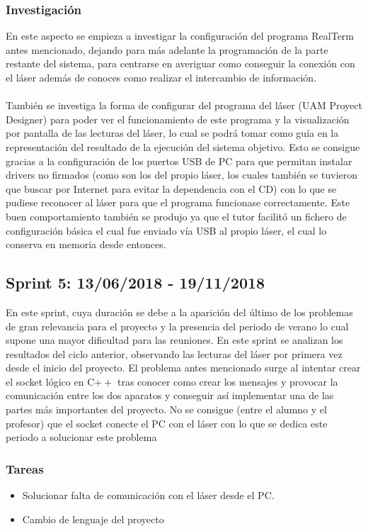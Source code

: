 \subsubsection{Investigación}
En este aspecto se empieza a investigar la configuración del programa RealTerm antes mencionado, dejando para más adelante la programación de la parte restante del sistema, para centrarse en averiguar como conseguir la conexión con el láser además de conoces como realizar el intercambio de información.\\
\\
También se investiga la forma de configurar del programa del láser (UAM Proyect Designer) para poder ver el funcionamiento de este programa y la visualización por pantalla de las lecturas del láser, lo cual se podrá tomar como guía en la representación del resultado de la ejecución del sistema objetivo. Esto se consigue gracias a la configuración de los puertos USB de PC para que permitan instalar drivers no firmados (como son los del propio láser, los cuales también se tuvieron que buscar por Internet para evitar la dependencia con el CD) con lo que se pudiese reconocer al láser para que el programa funcionase correctamente. Este buen comportamiento también se produjo ya que el tutor facilitó un fichero de configuración básica el cual fue enviado vía USB al propio láser, el cual lo conserva en memoria desde entonces.\\

\subsection{Sprint 5: 13/06/2018 - 19/11/2018}
En este sprint, cuya duración se debe a la aparición del último de los problemas de gran relevancia para el proyecto y la presencia del periodo de verano lo cual supone una mayor dificultad para las reuniones. En este sprint se analizan los resultados del ciclo anterior, observando las lecturas del láser por primera vez desde el inicio del proyecto. El problema antes mencionado surge al intentar crear el socket lógico en C$++$ tras conocer como crear los mensajes y provocar la comunicación entre los dos aparatos y conseguir así implementar una de las partes más importantes del proyecto. No se consigue (entre el alumno y el profesor) que el socket conecte el PC con el láser con lo que se dedica este periodo a solucionar este problema
\subsubsection{Tareas}
\begin{itemize}
	\item Solucionar falta de comunicación con el láser desde el PC.
	\item Cambio de lenguaje del proyecto
\end{itemize}
